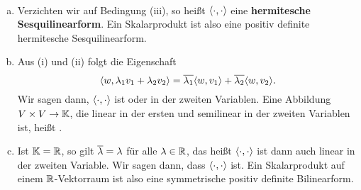 \begin{bemerkung}
	\label{bem:3.2}
	\mbox{} \\[-1.4cm]
	\begin{enumerate}[(a)]
		\item Verzichten wir auf Bedingung (iii), so heißt $\langle\cdot,\cdot\rangle$  eine \textbf{hermitesche Sesquilinearform}.
		Ein Skalarprodukt ist also eine positiv definite hermitesche Sesquilinearform. 
		\item Aus (i) und (ii) folgt die Eigenschaft
		\begin{equation}
			\sk{w,\lambda_1v_1+\lambda_2v_2} = \ol{\lambda_1} \sk{w,v_1} + \ol{\lambda_2} \sk{w,v_2}. \label{eq:antilin}
		\end{equation}
		Wir sagen dann, $\langle\cdot,\cdot\rangle$ ist  oder  in der zweiten Variablen.
		Eine Abbildung $V \times V \rightarrow \mathbb{K}$, die linear in der ersten und semilinear in der zweiten Variablen ist, heißt .
		\item Ist $\mathbb{K} = \mathbb{R}$, so gilt $\overline{\lambda} = \lambda$ für alle $\lambda \in \mathbb{R}$, das heißt $\langle\cdot,\cdot\rangle$ ist dann auch linear in der zweiten Variable.
		Wir sagen dann, dass $\langle\cdot,\cdot\rangle$  ist.
		Ein Skalarprodukt auf einem $\mathbb{R}$-Vektorraum ist also eine symmetrische positiv definite Bilinearform.
	\end{enumerate}
\end{bemerkung}


